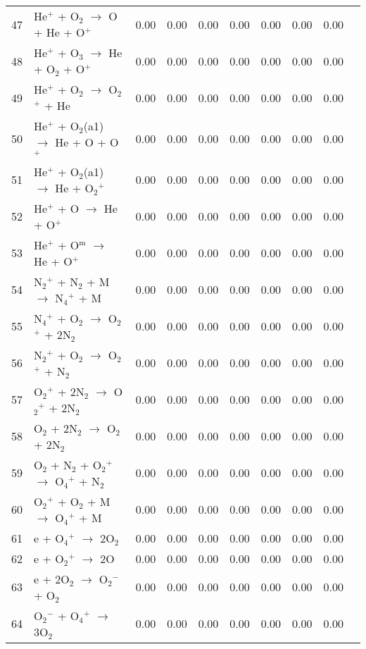 \documentclass{article}
\begin{document}
\begin{table}[H]
{\begin{tabu}{clcccccccc}
      47 & He$^{+}$ + O$_{2}$ $\rightarrow$ O + He + O$^{+}$ & 0.00 & 0.00 & 0.00 & 0.00 & 0.00 & 0.00 & 0.00 &  \\
      48 & He$^{+}$ + O$_{3}$ $\rightarrow$ He + O$_{2}$ + O$^{+}$ & 0.00 & 0.00 & 0.00 & 0.00 & 0.00 & 0.00 & 0.00 &  \\
      49 & He$^{+}$ + O$_{2}$ $\rightarrow$ O$_{2}$$^{+}$ + He & 0.00 & 0.00 & 0.00 & 0.00 & 0.00 & 0.00 & 0.00 &  \\
      50 & He$^{+}$ + O$_{2}$(a1) $\rightarrow$ He + O + O$^{+}$ & 0.00 & 0.00 & 0.00 & 0.00 & 0.00 & 0.00 & 0.00 &  \\
      51 & He$^{+}$ + O$_{2}$(a1) $\rightarrow$ He + O$_{2}$$^{+}$ & 0.00 & 0.00 & 0.00 & 0.00 & 0.00 & 0.00 & 0.00 &  \\
      52 & He$^{+}$ + O $\rightarrow$ He + O$^{+}$ & 0.00 & 0.00 & 0.00 & 0.00 & 0.00 & 0.00 & 0.00 &  \\
      53 & He$^{+}$ + O$^\text{m}$ $\rightarrow$ He + O$^{+}$ & 0.00 & 0.00 & 0.00 & 0.00 & 0.00 & 0.00 & 0.00 &  \\
      54 & N$_{2}$$^{+}$ + N$_{2}$ + M $\rightarrow$ N$_{4}$$^{+}$ + M & 0.00 & 0.00 & 0.00 & 0.00 & 0.00 & 0.00 & 0.00 &  \\
      55 & N$_{4}$$^{+}$ + O$_{2}$ $\rightarrow$ O$_{2}$$^{+}$ + 2N$_{2}$ & 0.00 & 0.00 & 0.00 & 0.00 & 0.00 & 0.00 & 0.00 &  \\
      56 & N$_{2}$$^{+}$ + O$_{2}$ $\rightarrow$ O$_{2}$$^{+}$ + N$_{2}$ & 0.00 & 0.00 & 0.00 & 0.00 & 0.00 & 0.00 & 0.00 &  \\
      57 & O$_{2}$$^{+}$ + 2N$_{2}$ $\rightarrow$ O$_{2}$$^{+}$ + 2N$_{2}$ & 0.00 & 0.00 & 0.00 & 0.00 & 0.00 & 0.00 & 0.00 &  \\
      58 & O$_{2}$ + 2N$_{2}$ $\rightarrow$ O$_{2}$ + 2N$_{2}$ & 0.00 & 0.00 & 0.00 & 0.00 & 0.00 & 0.00 & 0.00 &  \\
      59 & O$_{2}$ + N$_{2}$ + O$_{2}$$^{+}$ $\rightarrow$ O$_{4}$$^{+}$ + N$_{2}$ & 0.00 & 0.00 & 0.00 & 0.00 & 0.00 & 0.00 & 0.00 &  \\
      60 & O$_{2}$$^{+}$ + O$_{2}$ + M $\rightarrow$ O$_{4}$$^{+}$ + M & 0.00 & 0.00 & 0.00 & 0.00 & 0.00 & 0.00 & 0.00 &  \\
      61 & e + O$_{4}$$^{+}$ $\rightarrow$ 2O$_{2}$ & 0.00 & 0.00 & 0.00 & 0.00 & 0.00 & 0.00 & 0.00 &  \\
      62 & e + O$_{2}$$^{+}$ $\rightarrow$ 2O & 0.00 & 0.00 & 0.00 & 0.00 & 0.00 & 0.00 & 0.00 &  \\
      63 & e + 2O$_{2}$ $\rightarrow$ O$_{2}$$^{-}$ + O$_{2}$ & 0.00 & 0.00 & 0.00 & 0.00 & 0.00 & 0.00 & 0.00 &  \\
      64 & O$_{2}$$^{-}$ + O$_{4}$$^{+}$ $\rightarrow$ 3O$_{2}$ & 0.00 & 0.00 & 0.00 & 0.00 & 0.00 & 0.00 & 0.00 &  \\
    \end{tabu}
  }
\end{table}
\end{document}
